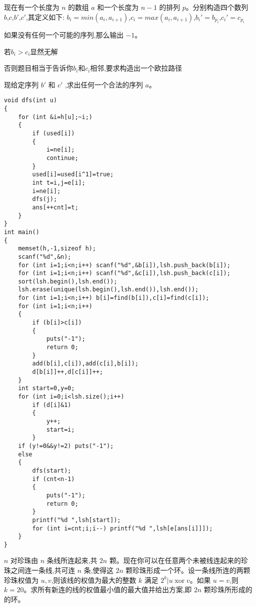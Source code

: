 \documentclass[a4paper]{ctexart}
\begin{document}
现在有一个长度为 $n$ 的数组 $a$ 和一个长度为 $n−1$ 的排列 $p$。分别构造四个数列 $b$,$c$,$b'$,$c'$,其定义如下:
$b_i=min(a_i,a_{i+1})$,$c_i=max(a_i,a_{i+1})$,$b_i'=b_{p_i}$,$c_i'=c_{p_i}$

如果没有任何一个可能的序列,那么输出 $-1$。

若$b_i>c_i$显然无解

否则题目相当于告诉你$b_i$和$c_i$相邻,要求构造出一个欧拉路径

现给定序列 $b'$ 和 $ c'$ ,求出任何一个合法的序列 $a$。

\begin{lstlisting}
void dfs(int u)
{
    for (int &i=h[u];~i;)
    {
        if (used[i])
        {
            i=ne[i];
            continue;
        }
        used[i]=used[i^1]=true;
        int t=i,j=e[i];
        i=ne[i];
        dfs(j);
        ans[++cnt]=t;
    }
}
int main()
{
    memset(h,-1,sizeof h);
    scanf("%d",&n);
    for (int i=1;i<n;i++) scanf("%d",&b[i]),lsh.push_back(b[i]);
    for (int i=1;i<n;i++) scanf("%d",&c[i]),lsh.push_back(c[i]);
    sort(lsh.begin(),lsh.end());
    lsh.erase(unique(lsh.begin(),lsh.end()),lsh.end());
    for (int i=1;i<n;i++) b[i]=find(b[i]),c[i]=find(c[i]);
    for (int i=1;i<n;i++)
    {
        if (b[i]>c[i])
        {
            puts("-1");
            return 0;
        }
        add(b[i],c[i]),add(c[i],b[i]);
        d[b[i]]++,d[c[i]]++;
    }
    int start=0,y=0;
    for (int i=0;i<lsh.size();i++)
        if (d[i]&1)
        {
            y++;
            start=i;
        }
    if (y!=0&&y!=2) puts("-1");
    else
    {
        dfs(start);
        if (cnt<n-1)
        {
            puts("-1");
            return 0;
        }
        printf("%d ",lsh[start]);
        for (int i=cnt;i;i--) printf("%d ",lsh[e[ans[i]]]);
    }
}
\end{lstlisting}

$n$ 对珍珠由 $n$ 条线所连起来,共 $2n$ 颗。现在你可以在任意两个未被线连起来的珍珠之间连一条线,共可连 $n$ 条,使得这 $2n$ 颗珍珠形成一个环。设一条线所连的两颗珍珠权值为 $u,v$,则该线的权值为最大的整数 $k$ 满足 $2^k | u \operatorname{xor} v$。如果 $u=v$,则 $k=20$。求所有新连的线的权值最小值的最大值并给出方案,即 $2n$ 颗珍珠所形成的的环。
\end{document}
